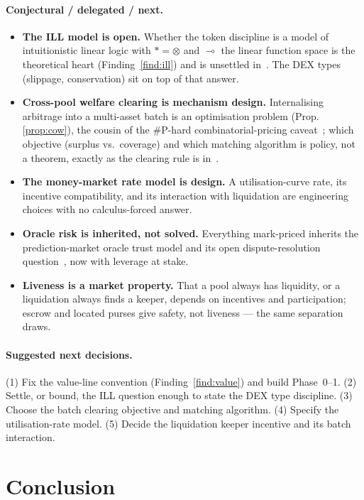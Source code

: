 \documentclass[11pt]{article}
\theoremstyle{definition}
\newcommand{\tensorsig}{\ensuremath{\ast}}
\newcommand{\lolli}{\ensuremath{\multimap}}
\begin{document}
\paragraph{Conjectural / delegated / next.}
\begin{itemize}[leftmargin=1.4em]
\item \textbf{The ILL model is open.} Whether the token discipline is a model of intuitionistic linear
logic with $\tensorsig = \otimes$ and $\lolli$ the linear function space is the theoretical heart
(Finding~\ref{find:ill}) and is unsettled in~\cite{cost}. The DEX types (slippage, conservation) sit on
top of that answer.
\item \textbf{Cross-pool welfare clearing is mechanism design.} Internalising arbitrage into a
multi-asset batch is an optimisation problem (Prop.\,\ref{prop:cow}), the cousin of the \#P-hard
combinatorial-pricing caveat~\cite[\S3]{predmkt}; which objective (surplus vs.\ coverage) and which
matching algorithm is policy, not a theorem, exactly as the clearing rule is in~\cite[\S12]{ppf}.
\item \textbf{The money-market rate model is design.} A utilisation-curve rate, its incentive
compatibility, and its interaction with liquidation are engineering choices with no calculus-forced
answer.
\item \textbf{Oracle risk is inherited, not solved.} Everything mark-priced inherits the
prediction-market oracle trust model and its open dispute-resolution question~\cite[\S4,\S8.5]{predmkt},
now with leverage at stake.
\item \textbf{Liveness is a market property.} That a pool always has liquidity, or a liquidation always
finds a keeper, depends on incentives and participation; escrow and located purses give safety, not
liveness --- the same separation~\cite[\S12]{ppf} draws.
\end{itemize}

\paragraph{Suggested next decisions.} (1) Fix the value-line convention (Finding~\ref{find:value}) and
build Phase~0--1. (2) Settle, or bound, the ILL question enough to state the DEX type discipline.
(3) Choose the batch clearing objective and matching algorithm. (4) Specify the utilisation-rate model.
(5) Decide the liquidation keeper incentive and its batch interaction.

\section{Conclusion}\label{sec:conclusion}
\end{document}
